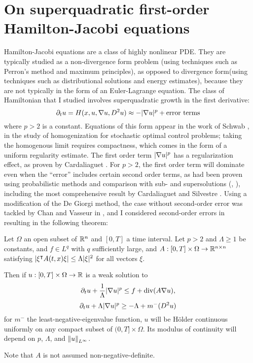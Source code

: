 \section{On superquadratic first-order Hamilton-Jacobi equations} \label{sec:hamjac}
Hamilton-Jacobi equations are a class of highly nonlinear PDE.  They are typically studied as a non-divergence form problem (using techniques such as Perron's method and maximum principles), as opposed to divergence form(using techniques such as distributional solutions and energy estimates), because they are not typically in the form of an Euler-Lagrange equation.  The class of Hamiltonian that I studied involves superquadratic growth in the first derivative:
\[ \partial_t u = H(x,u,\nabla u, D^2u) \approx -|\nabla u|^p + \textrm{error terms} \]
where $p > 2$ is a constant.  Equations of this form appear in the work of Schwab \cite{Sc}, in the study of homogenization for stochastic optimal control problems; taking the homogenous limit requires compactness, which comes in the form of a uniform regularity estimate.  The first order term $|\nabla u|^p$ has a regularization effect, as proven by Cardaliaguet \cite{Ca}.  %
For $p > 2$, the first order term will dominate even when the ``error'' includes certain second order terms, as had been proven using probabilistic methods and comparison with sub- and supersolutions (\cite{CaCa}, \cite{CaRa}), including the most comprehensive result by Cardaliaguet and Silvestre \cite{CaSi.hamjac}.  Using a modification of the De Giorgi method, the case without second-order error was tackled by Chan and Vasseur in \cite{ChVa}, and I considered second-order errors in \cite{StVa.hamjac} resulting in the following theorem:
\begin{theorem}
Let $\Omega$ an open subset of $\mathbb{R}^n$ and $[0,T]$ a time interval.  Let $p > 2$ and $\Lambda \geq 1$ be constants, and $f \in L^q$ with $q$ sufficiently large, and $A:[0,T]\times \Omega \to \mathbb{R}^{n\times n}$ satisfying $\left\lvert \xi^\intercal A(t,x) \xi \right\rvert \leq \Lambda |\xi|^2$ for all vectors $\xi$.  

Then if $u:[0,T]\times\Omega \to \mathbb{R}$ is a weak solution to
\[ \partial_t u + \frac{1}{\Lambda} |\nabla u|^p \leq f + \operatorname{div}(A \nabla u), \]
\[ \partial_t u + \Lambda |\nabla u|^p \geq -\Lambda + m^-(D^2 u) \]
for $m^-$ the least-negative-eigenvalue function, $u$ will be H\"{o}lder continuous uniformly on any compact subset of $(0,T] \times \Omega$.  Its modulus of continuity will depend on $p$, $\Lambda$, and $\left\lVert u\right\rVert_{L^\infty}$.  
\end{theorem}
Note that $A$ is not assumed non-negative-definite.  

